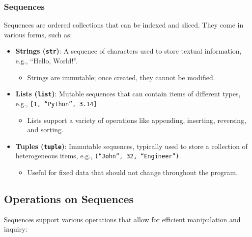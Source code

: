 \documentclass{article}
\begin{document}
\subsubsection{Sequences}

Sequences are ordered collections that can be indexed and sliced. They come in various forms, such as:

\begin{itemize}
    \item \textbf{Strings (\texttt{str})}: A sequence of characters used to store textual information, e.g., ``Hello, World!''.
    \begin{itemize}
        \item Strings are immutable; once created, they cannot be modified.
    \end{itemize}
    
    \item \textbf{Lists (\texttt{list})}: Mutable sequences that can contain items of different types, e.g., \texttt{[1, ``Python'', 3.14]}.
    \begin{itemize}
        \item Lists support a variety of operations like appending, inserting, reversing, and sorting.
    \end{itemize}
    
    \item \textbf{Tuples (\texttt{tuple})}: Immutable sequences, typically used to store a collection of heterogeneous items, e.g., \texttt{(``John'', 32, ``Engineer'')}.
    \begin{itemize}
        \item Useful for fixed data that should not change throughout the program.
    \end{itemize}
\end{itemize}

\subsection{Operations on Sequences}

Sequences support various operations that allow for efficient manipulation and inquiry:
\end{document}
